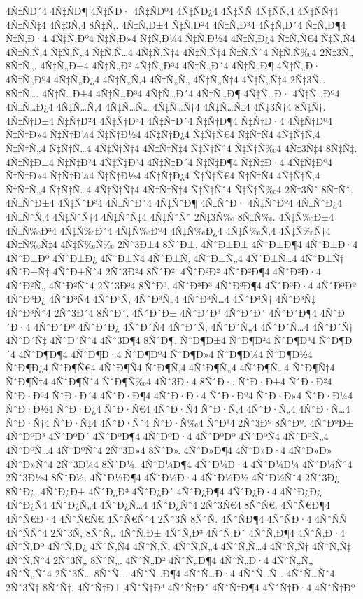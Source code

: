 {4Ñ‡ÑÐ´4
4Ñ‡ÑÐ¶
4Ñ‡ÑÐ·
4Ñ‡ÑÐº4
4Ñ‡ÑÐ¿4
4Ñ‡ÑÑ
4Ñ‡ÑÑ‚4
4Ñ‡ÑÑ†4
4Ñ‡ÑÑ‡4
4Ñ‡3Ñ‚4
8Ñ‡Ñ‚.
4Ñ‡Ñ‚Ð±4
Ñ‡Ñ‚Ð²4
4Ñ‡Ñ‚Ð³4
4Ñ‡Ñ‚Ð´4
Ñ‡Ñ‚Ð¶4
Ñ‡Ñ‚Ð·4
4Ñ‡Ñ‚Ðº4
Ñ‡Ñ‚Ð»4
Ñ‡Ñ‚Ð¼4
Ñ‡Ñ‚Ð½4
4Ñ‡Ñ‚Ð¿4
Ñ‡Ñ‚Ñ€4
Ñ‡Ñ‚Ñ4
4Ñ‡Ñ‚Ñ‚4
Ñ‡Ñ‚Ñ„4
Ñ‡Ñ‚Ñ…4
4Ñ‡Ñ‚Ñ†4
4Ñ‡Ñ‚Ñ‡4
Ñ‡Ñ‚Ñˆ4
Ñ‡Ñ‚Ñ‰4
2Ñ‡3Ñ„
8Ñ‡Ñ„.
4Ñ‡Ñ„Ð±4
4Ñ‡Ñ„Ð²
4Ñ‡Ñ„Ð³4
4Ñ‡Ñ„Ð´4
4Ñ‡Ñ„Ð¶
4Ñ‡Ñ„Ð·
4Ñ‡Ñ„Ðº4
4Ñ‡Ñ„Ð¿4
4Ñ‡Ñ„Ñ‚4
4Ñ‡Ñ„Ñ„
4Ñ‡Ñ„Ñ†4
4Ñ‡Ñ„Ñ‡4
2Ñ‡3Ñ…
8Ñ‡Ñ….
4Ñ‡Ñ…Ð±4
4Ñ‡Ñ…Ð³4
4Ñ‡Ñ…Ð´4
4Ñ‡Ñ…Ð¶
4Ñ‡Ñ…Ð·
4Ñ‡Ñ…Ðº4
4Ñ‡Ñ…Ð¿4
4Ñ‡Ñ…Ñ‚4
4Ñ‡Ñ…Ñ…
4Ñ‡Ñ…Ñ†4
4Ñ‡Ñ…Ñ‡4
4Ñ‡3Ñ†4
8Ñ‡Ñ†.
4Ñ‡Ñ†Ð±4
Ñ‡Ñ†Ð²4
4Ñ‡Ñ†Ð³4
4Ñ‡Ñ†Ð´4
Ñ‡Ñ†Ð¶4
Ñ‡Ñ†Ð·4
4Ñ‡Ñ†Ðº4
Ñ‡Ñ†Ð»4
Ñ‡Ñ†Ð¼4
Ñ‡Ñ†Ð½4
4Ñ‡Ñ†Ð¿4
Ñ‡Ñ†Ñ€4
Ñ‡Ñ†Ñ4
4Ñ‡Ñ†Ñ‚4
Ñ‡Ñ†Ñ„4
Ñ‡Ñ†Ñ…4
4Ñ‡Ñ†Ñ†4
4Ñ‡Ñ†Ñ‡4
Ñ‡Ñ†Ñˆ4
Ñ‡Ñ†Ñ‰4
4Ñ‡3Ñ‡4
8Ñ‡Ñ‡.
4Ñ‡Ñ‡Ð±4
Ñ‡Ñ‡Ð²4
4Ñ‡Ñ‡Ð³4
4Ñ‡Ñ‡Ð´4
Ñ‡Ñ‡Ð¶4
Ñ‡Ñ‡Ð·4
4Ñ‡Ñ‡Ðº4
Ñ‡Ñ‡Ð»4
Ñ‡Ñ‡Ð¼4
Ñ‡Ñ‡Ð½4
4Ñ‡Ñ‡Ð¿4
Ñ‡Ñ‡Ñ€4
Ñ‡Ñ‡Ñ4
4Ñ‡Ñ‡Ñ‚4
Ñ‡Ñ‡Ñ„4
Ñ‡Ñ‡Ñ…4
4Ñ‡Ñ‡Ñ†4
4Ñ‡Ñ‡Ñ‡4
Ñ‡Ñ‡Ñˆ4
Ñ‡Ñ‡Ñ‰4
2Ñ‡3Ñˆ
8Ñ‡Ñˆ.
4Ñ‡ÑˆÐ±4
4Ñ‡ÑˆÐ³4
4Ñ‡ÑˆÐ´4
4Ñ‡ÑˆÐ¶
4Ñ‡ÑˆÐ·
4Ñ‡ÑˆÐº4
4Ñ‡ÑˆÐ¿4
4Ñ‡ÑˆÑ‚4
4Ñ‡ÑˆÑ†4
4Ñ‡ÑˆÑ‡4
4Ñ‡ÑˆÑˆ
2Ñ‡3Ñ‰
8Ñ‡Ñ‰.
4Ñ‡Ñ‰Ð±4
4Ñ‡Ñ‰Ð³4
4Ñ‡Ñ‰Ð´4
4Ñ‡Ñ‰Ðº4
4Ñ‡Ñ‰Ð¿4
4Ñ‡Ñ‰Ñ‚4
4Ñ‡Ñ‰Ñ†4
4Ñ‡Ñ‰Ñ‡4
4Ñ‡Ñ‰Ñ‰
2Ñˆ3Ð±4
8ÑˆÐ±.
4ÑˆÐ±Ð±
4ÑˆÐ±Ð¶4
4ÑˆÐ±Ð·4
4ÑˆÐ±Ðº
4ÑˆÐ±Ð¿
4ÑˆÐ±Ñ4
4ÑˆÐ±Ñ‚
4ÑˆÐ±Ñ„4
4ÑˆÐ±Ñ…4
4ÑˆÐ±Ñ†
4ÑˆÐ±Ñ‡
4ÑˆÐ±Ñˆ4
2Ñˆ3Ð²4
8ÑˆÐ².
4ÑˆÐ²Ð²
4ÑˆÐ²Ð¶4
4ÑˆÐ²Ð·4
4ÑˆÐ²Ñ„
4ÑˆÐ²Ñˆ4
2Ñˆ3Ð³4
8ÑˆÐ³.
4ÑˆÐ³Ð³
4ÑˆÐ³Ð¶4
4ÑˆÐ³Ð·4
4ÑˆÐ³Ðº
4ÑˆÐ³Ð¿
4ÑˆÐ³Ñ4
4ÑˆÐ³Ñ‚
4ÑˆÐ³Ñ„4
4ÑˆÐ³Ñ…4
4ÑˆÐ³Ñ†
4ÑˆÐ³Ñ‡
4ÑˆÐ³Ñˆ4
2Ñˆ3Ð´4
8ÑˆÐ´.
4ÑˆÐ´Ð±
4ÑˆÐ´Ð³
4ÑˆÐ´Ð´
4ÑˆÐ´Ð¶4
4ÑˆÐ´Ð·4
4ÑˆÐ´Ðº
4ÑˆÐ´Ð¿
4ÑˆÐ´Ñ4
4ÑˆÐ´Ñ‚
4ÑˆÐ´Ñ„4
4ÑˆÐ´Ñ…4
4ÑˆÐ´Ñ†
4ÑˆÐ´Ñ‡
4ÑˆÐ´Ñˆ4
4Ñˆ3Ð¶4
8ÑˆÐ¶.
ÑˆÐ¶Ð±4
ÑˆÐ¶Ð²4
ÑˆÐ¶Ð³4
ÑˆÐ¶Ð´4
4ÑˆÐ¶Ð¶4
4ÑˆÐ¶Ð·4
ÑˆÐ¶Ðº4
ÑˆÐ¶Ð»4
ÑˆÐ¶Ð¼4
ÑˆÐ¶Ð½4
ÑˆÐ¶Ð¿4
ÑˆÐ¶Ñ€4
4ÑˆÐ¶Ñ4
ÑˆÐ¶Ñ‚4
4ÑˆÐ¶Ñ„4
4ÑˆÐ¶Ñ…4
ÑˆÐ¶Ñ†4
ÑˆÐ¶Ñ‡4
4ÑˆÐ¶Ñˆ4
ÑˆÐ¶Ñ‰4
4Ñˆ3Ð·4
8ÑˆÐ·.
ÑˆÐ·Ð±4
ÑˆÐ·Ð²4
ÑˆÐ·Ð³4
ÑˆÐ·Ð´4
4ÑˆÐ·Ð¶4
4ÑˆÐ·Ð·4
ÑˆÐ·Ðº4
ÑˆÐ·Ð»4
ÑˆÐ·Ð¼4
ÑˆÐ·Ð½4
ÑˆÐ·Ð¿4
ÑˆÐ·Ñ€4
4ÑˆÐ·Ñ4
ÑˆÐ·Ñ‚4
4ÑˆÐ·Ñ„4
4ÑˆÐ·Ñ…4
ÑˆÐ·Ñ†4
ÑˆÐ·Ñ‡4
4ÑˆÐ·Ñˆ4
ÑˆÐ·Ñ‰4
ÑˆÐ¹4
2Ñˆ3Ðº
8ÑˆÐº.
4ÑˆÐºÐ±
4ÑˆÐºÐ³
4ÑˆÐºÐ´
4ÑˆÐºÐ¶4
4ÑˆÐºÐ·4
4ÑˆÐºÐº
4ÑˆÐºÑ4
4ÑˆÐºÑ„4
4ÑˆÐºÑ…4
4ÑˆÐºÑˆ4
2Ñˆ3Ð»4
8ÑˆÐ».
4ÑˆÐ»Ð¶4
4ÑˆÐ»Ð·4
4ÑˆÐ»Ð»
4ÑˆÐ»Ñˆ4
2Ñˆ3Ð¼4
8ÑˆÐ¼.
4ÑˆÐ¼Ð¶4
4ÑˆÐ¼Ð·4
4ÑˆÐ¼Ð¼
4ÑˆÐ¼Ñˆ4
2Ñˆ3Ð½4
8ÑˆÐ½.
4ÑˆÐ½Ð¶4
4ÑˆÐ½Ð·4
4ÑˆÐ½Ð½
4ÑˆÐ½Ñˆ4
2Ñˆ3Ð¿
8ÑˆÐ¿.
4ÑˆÐ¿Ð±
4ÑˆÐ¿Ð³
4ÑˆÐ¿Ð´
4ÑˆÐ¿Ð¶4
4ÑˆÐ¿Ð·4
4ÑˆÐ¿Ð¿
4ÑˆÐ¿Ñ4
4ÑˆÐ¿Ñ„4
4ÑˆÐ¿Ñ…4
4ÑˆÐ¿Ñˆ4
2Ñˆ3Ñ€4
8ÑˆÑ€.
4ÑˆÑ€Ð¶4
4ÑˆÑ€Ð·4
4ÑˆÑ€Ñ€
4ÑˆÑ€Ñˆ4
2Ñˆ3Ñ
8ÑˆÑ.
4ÑˆÑÐ¶4
4ÑˆÑÐ·4
4ÑˆÑÑ
4ÑˆÑÑˆ4
2Ñˆ3Ñ‚
8ÑˆÑ‚.
4ÑˆÑ‚Ð±
4ÑˆÑ‚Ð³
4ÑˆÑ‚Ð´
4ÑˆÑ‚Ð¶4
4ÑˆÑ‚Ð·4
4ÑˆÑ‚Ðº
4ÑˆÑ‚Ð¿
4ÑˆÑ‚Ñ4
4ÑˆÑ‚Ñ‚
4ÑˆÑ‚Ñ„4
4ÑˆÑ‚Ñ…4
4ÑˆÑ‚Ñ†
4ÑˆÑ‚Ñ‡
4ÑˆÑ‚Ñˆ4
2Ñˆ3Ñ„
8ÑˆÑ„.
4ÑˆÑ„Ð²
4ÑˆÑ„Ð¶4
4ÑˆÑ„Ð·4
4ÑˆÑ„Ñ„
4ÑˆÑ„Ñˆ4
2Ñˆ3Ñ…
8ÑˆÑ….
4ÑˆÑ…Ð¶4
4ÑˆÑ…Ð·4
4ÑˆÑ…Ñ…
4ÑˆÑ…Ñˆ4
2Ñˆ3Ñ†
8ÑˆÑ†.
4ÑˆÑ†Ð±
4ÑˆÑ†Ð³
4ÑˆÑ†Ð´
4ÑˆÑ†Ð¶4
4ÑˆÑ†Ð·4
4ÑˆÑ†Ðº
}
